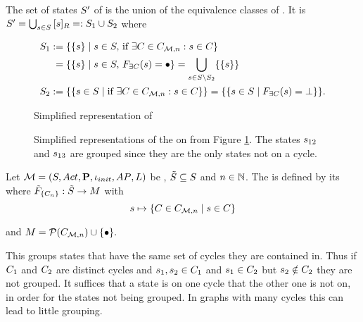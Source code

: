 \documentclass[preview]{standalone}
\begin{document}
The set of states ${S}'$ of \viewhascycle is the union of the equivalence classes of \eqrelview. It is ${S}' = \bigcup_{{s} \in {S}} {{[{s}]_{{R}}}} =: {S}_1 \cup {S}_2$ where

\begin{align*}
	\states_1 &:= \{\{\state\} \mid \state \in \states, \,\text{if } \exists \cycle \in \cycleset : \state \in \cycle\} \\
	&\;= \{\{\state\} \mid \state \in \states, \, \gfcthascycle(\state) = \remelem\} = \nogroupstates \\
	\states_2 &:= \{\{\state \in \states  \mid \text{if } \exists \cycle \in \cycleset : \state \in \cycle \}\} = \{\{\state \in \states \mid \gfcthascycle(\state) = \notppty\}\}.
\end{align*}

\begin{figure}[h]
	\centering
				
	\caption{Simplified representation of \mdp}
	\label{fig:cyclesBefore}  
\end{figure}

\begin{figure}[h]
	\centering
	
	\caption{Simplified representations of the \viewN \viewhascycle on \chgph from Figure \ref{fig:cyclesBefore}. The states ${s}_{12}$ and ${s}_{13}$ are grouped since they are the only states not on a cycle.}
	\label{fig:cycleAfterHas}  
\end{figure}

\begin{definition}
	Let ${{{\mathcal{M}}}} = {{({S}, {Act}, {\textbf{P}}, {\iota_{init}}, {AP}, {L})}}$ be \achgphN, ${\tilde{{S}}} \subseteq {S}$ and $n \in {\mathbb{N}}$. The \viewN \viewexactcycle is defined by its \grpfctN \gfctexactcycle where ${{\tilde{F}_{{\{{C}_n\}}}}} : {\tilde{{S}}} \to {\ensuremath{{M}}}$ with
	\[
	\state \mapsto \{\cycle \in \cycleset \mid \state \in \cycle\}
	\]
	
	and $\imggrp = \powerset{\cycleset}\cup \remset.$
	\label{def:exactcycleview}
\end{definition}

This \viewN groups states that have the same set of cycles they are contained in. Thus if ${C}_1$ and ${C}_2$ are distinct cycles and ${s}_1, {s}_2 \in {C}_1$ and ${s}_1 \in {C}_2$ but ${s}_2 \notin {C}_2$ they are not grouped. It suffices that a state is on one cycle that the other one is not on, in order for the states not being grouped. In graphs with many cycles this can lead to little grouping.
\end{document}
